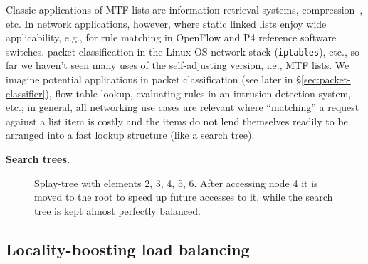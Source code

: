 Classic applications of MTF lists are information retrieval systems, compression~\cite{BentleySTW86}, etc. In network applications, however, where static linked lists enjoy wide applicability, e.g., for rule matching in OpenFlow and P4 reference software switches, packet classification in the Linux OS network stack (\texttt{iptables}), etc., so far we haven't seen many uses of the self-adjusting version, i.e., MTF lists. We imagine potential applications in packet classification (see later in \S\ref{sec:packet-classifier}), flow table lookup, evaluating rules in an intrusion detection system, etc.; in general, all networking use cases are relevant where ``matching'' a request against a list item is costly and the items do not lend themselves readily to be arranged into a fast lookup structure (like a search tree).



\noindent%
\textbf{Search trees.}


\begin{figure}
 \centering
 \caption{Splay-tree with elements 2, 3, 4, 5, 6. After accessing node 4 it is moved to the root to speed up future accesses to it, while the search tree is kept almost perfectly balanced.}
 \label{fig:bst_root_3}
\end{figure}




\subsection{Locality-boosting load balancing}
\label{sec:lb-lb}

